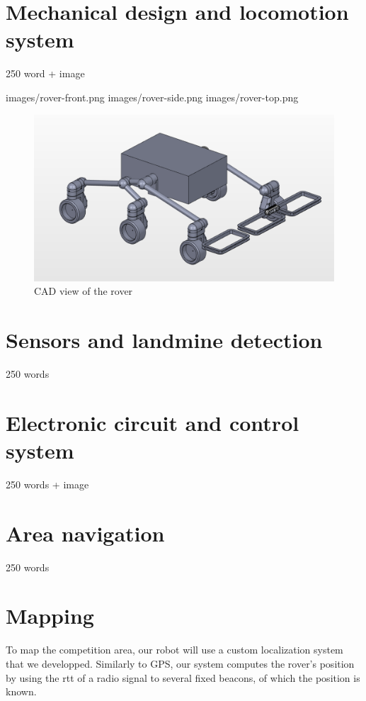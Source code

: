 \section{Mechanical design and locomotion system}
250 word + image

images/rover-front.png
images/rover-side.png
images/rover-top.png

\begin{figure}[htbp]
   \caption{\label{fig:rover} CAD view of the rover}
   \includegraphics[width=\textwidth]{images/rover}
\end{figure}

\section{Sensors and landmine detection}
250 words

\section{Electronic circuit and control system}
250 words + image

\section{Area navigation}
250 words

\section{Mapping}

To map the competition area, our robot will use a custom localization system that we developped.
Similarly to GPS, our system computes the rover's position by using the \gls{rtt} of a radio signal to several fixed beacons, of which the position is known.

